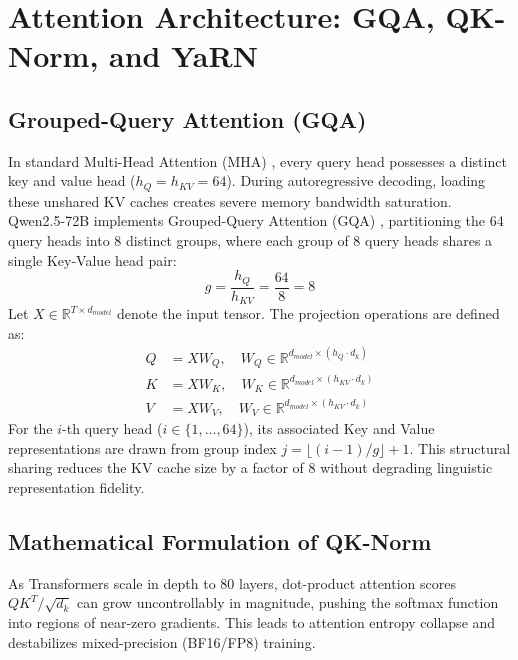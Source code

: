\documentclass[conference]{IEEEtran}
\begin{document}
\section{Attention Architecture: GQA, QK-Norm, and YaRN}

\subsection{Grouped-Query Attention (GQA)}
In standard Multi-Head Attention (MHA) \cite{vaswani2017attention}, every query head possesses a distinct key and value head ($h_Q = h_{KV} = 64$). During autoregressive decoding, loading these unshared KV caches creates severe memory bandwidth saturation. Qwen2.5-72B implements Grouped-Query Attention (GQA) \cite{ainslie2023gqa}, partitioning the 64 query heads into 8 distinct groups, where each group of 8 query heads shares a single Key-Value head pair:
\begin{equation}
g = \frac{h_Q}{h_{KV}} = \frac{64}{8} = 8
\end{equation}
Let $X \in \mathbb{R}^{T \times d_{model}}$ denote the input tensor. The projection operations are defined as:
\begin{align}
Q &= X W_Q, \quad W_Q \in \mathbb{R}^{d_{model} \times (h_Q \cdot d_k)} \\
K &= X W_K, \quad W_K \in \mathbb{R}^{d_{model} \times (h_{KV} \cdot d_k)} \\
V &= X W_V, \quad W_V \in \mathbb{R}^{d_{model} \times (h_{KV} \cdot d_k)}
\end{align}
For the $i$-th query head ($i \in \{1, \dots, 64\}$), its associated Key and Value representations are drawn from group index $j = \lfloor (i-1)/g \rfloor + 1$. This structural sharing reduces the KV cache size by a factor of 8 without degrading linguistic representation fidelity.

\subsection{Mathematical Formulation of QK-Norm}
As Transformers scale in depth to 80 layers, dot-product attention scores $Q K^T / \sqrt{d_k}$ can grow uncontrollably in magnitude, pushing the softmax function into regions of near-zero gradients. This leads to attention entropy collapse and destabilizes mixed-precision (BF16/FP8) training.
\end{document}
